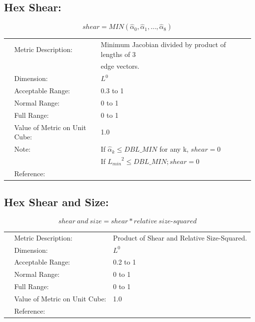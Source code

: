 \documentclass[12pt]{article}
\begin{document}
\subsection*{Hex Shear:}

\begin{displaymath}
shear = MIN \left( {\hat \alpha_0},
                   {\hat \alpha_1},...,
                   {\hat \alpha_8} \right)
\end{displaymath}

\begin{tabular}{lll}
& Metric Description:  & Minimum Jacobian divided by product of lengths of 3 \\ 
&                      & edge vectors. \\
& Dimension:           & $L^0$       \\ 
& Acceptable Range:    & 0.3 to 1 \\ 
& Normal Range:        & 0 to 1 \\ 
& Full Range:          & 0 to 1 \\ 
& Value of Metric on Unit Cube:    & 1.0 \\
& Note:                & If $\hat \alpha_k \leq DBL\_MIN$ for any k, $shear = 0$ \\ 
&                      & If ${L_{min}}^2 \leq DBL\_MIN; shear = 0$ \\
& Reference:           & \cite{four} \\
\end{tabular} 


\subsection*{Hex Shear and Size:}

\begin{displaymath}
shear~and~size = shear * relative~size \textrm{-}squared 
\end{displaymath}

\begin{tabular}{lll}
& Metric Description:  & Product of Shear and Relative Size-Squared.\\ 
& Dimension:           & $L^0$       \\ 
& Acceptable Range:    & 0.2 to 1 \\ 
& Normal Range:        & 0 to 1 \\ 
& Full Range:          & 0 to 1 \\ 
& Value of Metric on Unit Cube:    & 1.0 \\
& Reference:           & \cite{four} \\
\end{tabular} 
\end{document}
